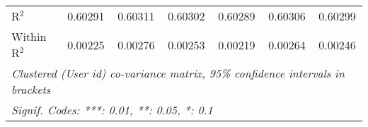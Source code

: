\begin{table}[htbp]
\begin{threeparttable}[b]
\begin{tabular}{lcccccc}
         R$^2$                          & 0.60291        & 0.60311        & 0.60302        & 0.60289         & 0.60306         & 0.60299\\  
         Within R$^2$                   & 0.00225        & 0.00276        & 0.00253        & 0.00219         & 0.00264         & 0.00246\\  
         \midrule \midrule
         \multicolumn{7}{l}{\emph{Clustered (User id) co-variance matrix, 95\% confidence intervals in brackets}}\\
         \multicolumn{7}{l}{\emph{Signif. Codes: ***: 0.01, **: 0.05, *: 0.1}}\\
      \end{tabular}
   \end{threeparttable}
\end{table}


